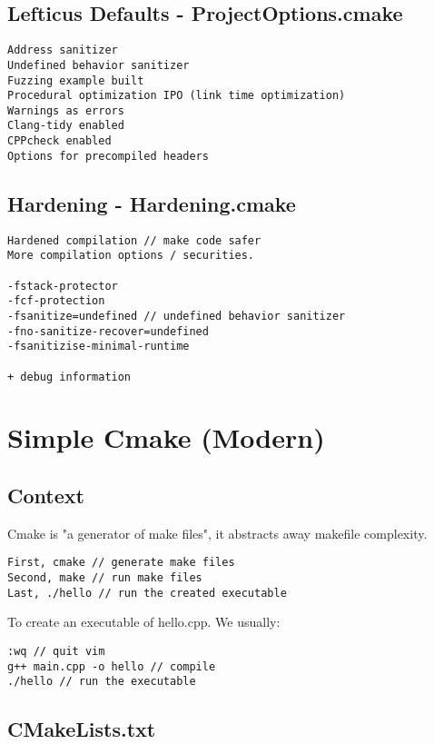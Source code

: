 \documentclass[openany]{report}
\begin{document}
\subsection{Lefticus Defaults - ProjectOptions.cmake}

\begin{verbatim}
Address sanitizer
Undefined behavior sanitizer
Fuzzing example built
Procedural optimization IPO (link time optimization)
Warnings as errors
Clang-tidy enabled
CPPcheck enabled
Options for precompiled headers
\end{verbatim}

\subsection{Hardening - Hardening.cmake}

\begin{verbatim}
Hardened compilation // make code safer
More compilation options / securities.

-fstack-protector
-fcf-protection
-fsanitize=undefined // undefined behavior sanitizer
-fno-sanitize-recover=undefined
-fsanitizise-minimal-runtime

+ debug information 
\end{verbatim}

\section{Simple Cmake (Modern)}

\subsection{Context}

Cmake is "a generator of make files", it abstracts away makefile complexity.

\begin{verbatim}
First, cmake // generate make files
Second, make // run make files
Last, ./hello // run the created executable
\end{verbatim}

To create an executable of hello.cpp. We usually:
\begin{verbatim}
:wq // quit vim
g++ main.cpp -o hello // compile 
./hello // run the executable
\end{verbatim}

\subsection{CMakeLists.txt}
\end{document}
